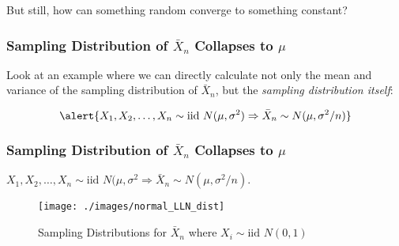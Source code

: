 \documentclass[handout]{beamer}
\begin{document}
\begin{frame}
\huge\begin{center} But still, how can something random converge to something constant? \end{center}
\end{frame}

\begin{frame}
\frametitle{Sampling Distribution of $\bar{X}_n$ Collapses to $\mu$}
Look at an example where we can directly calculate not only the mean and variance of the sampling distribution of $\bar{X}_n$, but the \emph{sampling distribution itself}:

\vspace{1em}
$$\alert{X_1, X_2, \hdots, X_n \sim \mbox{iid } N(\mu,\sigma^2) \Rightarrow \bar{X}_n \sim N(\mu, \sigma^2/n)}$$


\end{frame}






\begin{frame}
\frametitle{Sampling Distribution of $\bar{X}_n$ Collapses to $\mu$}
\alert{$X_1, X_2, \hdots, X_n \sim \mbox{iid } N(\mu,\sigma^2 \Rightarrow \bar{X}_n \sim N(\mu, \sigma^2/n)$.} \\
\begin{figure}
\centering
\texttt{[image: ./images/normal\_LLN\_dist]}
\caption{Sampling Distributions for $\bar{X}_n$ where $X_i \sim \mbox{iid } N(0,1)$}
\end{figure}

\end{frame}




\end{document}
